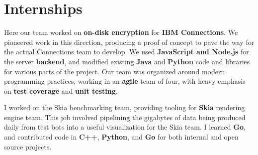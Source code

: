 \documentclass{my_resume}
\begin{document}
\section{Internships}
\begin{flushleft}
Here our team worked on \textbf{on-disk encryption} for \textbf{IBM Connections}.
We pioneered work in this direction, producing a proof of concept to pave the way for the actual Connections team to develop.
We used \textbf{JavaScript and Node.js} for the server \textbf{backend}, and modified existing \textbf{Java} and \textbf{Python} code and libraries for various parts of the project.
Our team was organized around modern programming practices, working in an \textbf{agile} team of four, with heavy emphasis on \textbf{test coverage} and \textbf{unit testing}.
\end{flushleft}
\begin{flushleft}
I worked on the Skia benchmarking team, providing tooling for \textbf{Skia} rendering engine team.
This job involved pipelining the gigabytes of data being produced daily from test bots into a useful visualization for the Skia team.
I learned \textbf{Go}, and contributed code in \textbf{C++}, \textbf{Python}, and \textbf{Go} for both internal and open source projects.
\end{flushleft}
\end{document}

